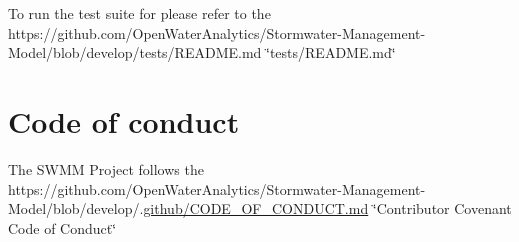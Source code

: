 To run the test suite for please refer to the https\+://github.com/\+Open\+Water\+Analytics/\+Stormwater-\/\+Management-\/\+Model/blob/develop/tests/\+R\+E\+A\+D\+M\+E.\+md \char`\"{}tests/\+R\+E\+A\+D\+M\+E.\+md\char`\"{}

\section*{Code of conduct}

The S\+W\+MM Project follows the https\+://github.com/\+Open\+Water\+Analytics/\+Stormwater-\/\+Management-\/\+Model/blob/develop/.\hyperlink{_c_o_d_e___o_f___c_o_n_d_u_c_t_8md_source}{github/\+C\+O\+D\+E\+\_\+\+O\+F\+\_\+\+C\+O\+N\+D\+U\+C\+T.\+md} \char`\"{}\+Contributor Covenant Code of Conduct\char`\"{} 